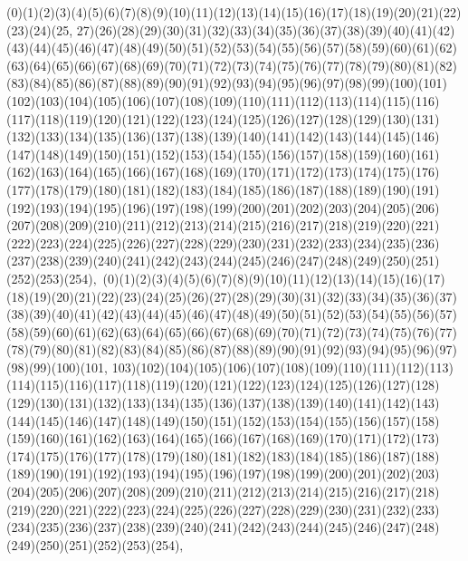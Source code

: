 \documentclass[12pt]{article}
\begin{document}
{(0)(1)(2)(3)(4)(5)(6)(7)(8)(9)(10)(11)(12)(13)(14)(15)(16)(17)(18)(19)(20)(21)(22)(23)(24)(25, 27)(26)(28)(29)(30)(31)(32)(33)(34)(35)(36)(37)(38)(39)(40)(41)(42)(43)(44)(45)(46)(47)(48)(49)(50)(51)(52)(53)(54)(55)(56)(57)(58)(59)(60)(61)(62)(63)(64)(65)(66)(67)(68)(69)(70)(71)(72)(73)(74)(75)(76)(77)(78)(79)(80)(81)(82)(83)(84)(85)(86)(87)(88)(89)(90)(91)(92)(93)(94)(95)(96)(97)(98)(99)(100)(101)(102)(103)(104)(105)(106)(107)(108)(109)(110)(111)(112)(113)(114)(115)(116)(117)(118)(119)(120)(121)(122)(123)(124)(125)(126)(127)(128)(129)(130)(131)(132)(133)(134)(135)(136)(137)(138)(139)(140)(141)(142)(143)(144)(145)(146)(147)(148)(149)(150)(151)(152)(153)(154)(155)(156)(157)(158)(159)(160)(161)(162)(163)(164)(165)(166)(167)(168)(169)(170)(171)(172)(173)(174)(175)(176)(177)(178)(179)(180)(181)(182)(183)(184)(185)(186)(187)(188)(189)(190)(191)(192)(193)(194)(195)(196)(197)(198)(199)(200)(201)(202)(203)(204)(205)(206)(207)(208)(209)(210)(211)(212)(213)(214)(215)(216)(217)(218)(219)(220)(221)(222)(223)(224)(225)(226)(227)(228)(229)(230)(231)(232)(233)(234)(235)(236)(237)(238)(239)(240)(241)(242)(243)(244)(245)(246)(247)(248)(249)(250)(251)(252)(253)(254)$
, 
$
(0)(1)(2)(3)(4)(5)(6)(7)(8)(9)(10)(11)(12)(13)(14)(15)(16)(17)(18)(19)(20)(21)(22)(23)(24)(25)(26)(27)(28)(29)(30)(31)(32)(33)(34)(35)(36)(37)(38)(39)(40)(41)(42)(43)(44)(45)(46)(47)(48)(49)(50)(51)(52)(53)(54)(55)(56)(57)(58)(59)(60)(61)(62)(63)(64)(65)(66)(67)(68)(69)(70)(71)(72)(73)(74)(75)(76)(77)(78)(79)(80)(81)(82)(83)(84)(85)(86)(87)(88)(89)(90)(91)(92)(93)(94)(95)(96)(97)(98)(99)(100)(101, 103)(102)(104)(105)(106)(107)(108)(109)(110)(111)(112)(113)(114)(115)(116)(117)(118)(119)(120)(121)(122)(123)(124)(125)(126)(127)(128)(129)(130)(131)(132)(133)(134)(135)(136)(137)(138)(139)(140)(141)(142)(143)(144)(145)(146)(147)(148)(149)(150)(151)(152)(153)(154)(155)(156)(157)(158)(159)(160)(161)(162)(163)(164)(165)(166)(167)(168)(169)(170)(171)(172)(173)(174)(175)(176)(177)(178)(179)(180)(181)(182)(183)(184)(185)(186)(187)(188)(189)(190)(191)(192)(193)(194)(195)(196)(197)(198)(199)(200)(201)(202)(203)(204)(205)(206)(207)(208)(209)(210)(211)(212)(213)(214)(215)(216)(217)(218)(219)(220)(221)(222)(223)(224)(225)(226)(227)(228)(229)(230)(231)(232)(233)(234)(235)(236)(237)(238)(239)(240)(241)(242)(243)(244)(245)(246)(247)(248)(249)(250)(251)(252)(253)(254)$
, 
$
}
\end{document}
